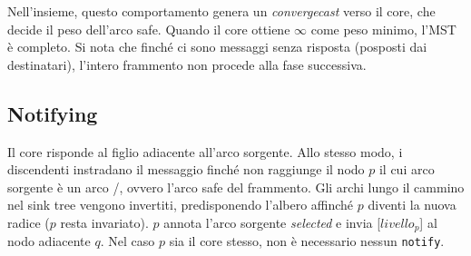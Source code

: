 \documentclass[target=bach,aauheader=,style=]{thud}
\newcommand{\eng}[1]{\foreignlanguage{english}{#1}}
\begin{document}
Nell'insieme, questo comportamento genera un \emph{\eng{convergecast}} verso il core, che decide il peso dell'arco \eng{safe}. Quando il core ottiene $\infty$ come peso minimo, l'MST è completo. Si nota che finché ci sono messaggi  senza risposta (posposti dai destinatari), l'intero frammento non procede alla fase successiva.

\subsection{\eng{Notifying}}
Il core risponde  al figlio adiacente all'arco sorgente. Allo stesso modo, i discendenti instradano il messaggio finché non raggiunge il nodo $p$ il cui arco sorgente è un arco \undecided/, ovvero l'arco \eng{safe} del frammento. Gli archi lungo il cammino nel \eng{sink tree} vengono invertiti, predisponendo l'albero affinché $p$ diventi la nuova radice ($p$ resta invariato). $p$ annota l'arco sorgente \emph{\eng{selected}} e invia [$livello_p$] al nodo adiacente $q$. Nel caso $p$ sia il core stesso, non è necessario nessun \lstinline{notify}.
\end{document}
